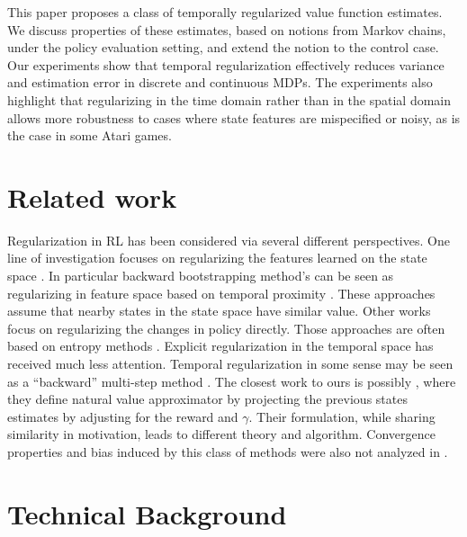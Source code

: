 \documentclass{article}
\begin{document}
This paper proposes a class of temporally regularized value function estimates. We discuss properties of these estimates, based on notions from Markov chains, under the policy evaluation setting, and extend the notion to the control case.
Our experiments show that temporal regularization effectively reduces variance and estimation error in discrete and continuous MDPs.  The experiments also highlight that regularizing in the time domain rather than in the spatial domain allows more robustness to cases where state features are mispecified or noisy, as is the case in some Atari games.



\section{Related work}
Regularization in RL has been considered via several different perspectives. One line of investigation focuses on regularizing the features learned on the state space \citep{massoud2009regularized,petrik2010feature,pazis2011non,farahmand2011regularization,liu2012regularized,harrigan2016deep}. In particular backward bootstrapping method's can be seen as regularizing in feature space based on temporal proximity \cite{sutton2009fast,li2008worst,baird1995residual}.  These approaches assume that nearby states in the state space have similar value. Other works focus on regularizing the changes in policy directly. Those approaches are often based on entropy methods \citep{neu2017unified,schulman2017proximal,bartlett2009regal}.
Explicit regularization in the temporal space has received much less attention.
Temporal regularization in some sense may be seen as a ``backward'' multi-step method \citep{sutton1998reinforcement}.  The closest work to ours is possibly \citep{xu2017natural}, where they define natural value approximator by projecting the previous states estimates by adjusting for the reward and $\gamma$. Their formulation, while sharing similarity in motivation, leads to different theory and algorithm.
Convergence properties and bias induced by this class of methods were also not analyzed in \citet{xu2017natural}.
\section{Technical Background}
\end{document}
